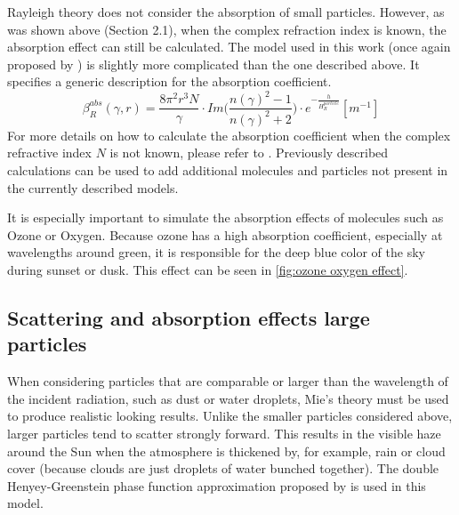 \documentclass{ctuthesis}
\begin{document}
Rayleigh theory does not consider the absorption of small particles. However, as was shown above (Section 2.1),
when the complex refraction index is known, the absorption effect can still be calculated.
The model used in this work (once again proposed by \cite{costa_bock_emmart_hansen_ynnerman_silva_2021})
is slightly more complicated than the one described above. It specifies a generic description for
the absorption coefficient.
\begin{equation}
    \beta_{R}^{abs}(\gamma,r) = \frac{8 \pi^{2}r^{3}N}{\gamma} \cdot Im \bigg(\frac{n(\gamma)^{2}-1}{n(\gamma)^{2} + 2}\bigg) \cdot e^{-\frac{h}{H^{particle}_{R}}} [m^{-1}]
\end{equation}
For more details on how to calculate the absorption coefficient when the complex refractive index $N$
is not known, please refer to \cite{costa_bock_emmart_hansen_ynnerman_silva_2021}. 
Previously described calculations can be used to add additional molecules and 
particles not present in the currently described models.

It is especially important to simulate the absorption effects of molecules such as Ozone or 
Oxygen. Because ozone has a high absorption coefficient, especially at wavelengths around green, it is responsible for the deep blue color of the sky during sunset or dusk. 
This effect can be seen in \ref{fig:ozone oxygen effect}.

\subsection{Scattering and absorption effects large particles}
\label{mie scattering big particles}
When considering particles that are comparable or larger than the wavelength of the incident
radiation, such as dust or water droplets, Mie's theory must be used to produce realistic looking results. 
Unlike the smaller particles considered above, larger particles tend to scatter strongly forward. 
This results in the visible haze around the Sun when the atmosphere is thickened by, for example,
rain or cloud cover (because clouds are just droplets of water bunched together). 
The double Henyey-Greenstein phase function approximation proposed by 
\cite{costa_bock_emmart_hansen_ynnerman_silva_2021} is used in this model.
\end{document}
